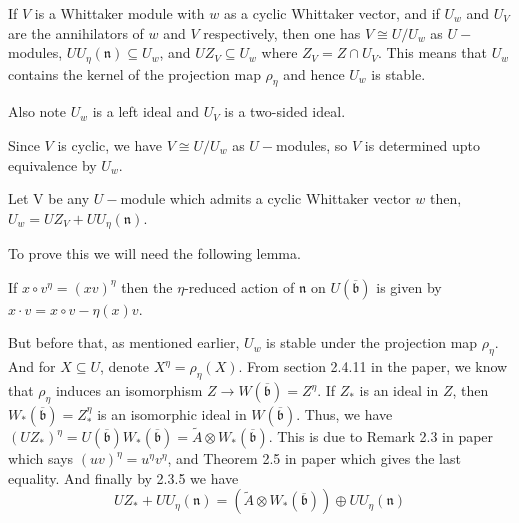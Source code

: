\documentclass{article}
\theoremstyle{mytheoremstyle}
\theoremstyle{mytheoremstyle}
\theoremstyle{myproblemstyle}
\begin{document}
    If $V$ is a Whittaker module with $w$ as a cyclic Whittaker vector, and if $U_w$ and $U_V$ are the annihilators of $w$ and $V$ 
    respectively, then one has $V \cong U/U_w$ as $U-$modules, $UU_\eta(\mathfrak n) \subseteq U_w$, and $UZ_V \subseteq U_w$ where 
    $Z_V = Z \cap U_V$. This means that $U_w$ contains the kernel of the projection map $\rho_\eta$ and hence $U_w$ is stable.

    Also note $U_w$ is a left ideal and $U_V$ is a two-sided ideal.

    \begin{remark}
    Since $V$ is cyclic, we have $V \cong U/U_w$ as $U-$modules, so $V$ is determined upto equivalence by $U_w$.
    \label{remark:V-determined-by-U-w}
    \end{remark}
    

    \begin{theorem}[$U_w$ decomposition]
    \label{thm:U_w_decomposition}
	 Let V be any $U-$module which admits a cyclic Whittaker vector $w$ then, $U_w = UZ_V + UU_\eta(\mathfrak n)$. 
    \end{theorem}

    To prove this we will need the following lemma. 

    \begin{definition}
    If $x \circ v^\eta = (xv)^\eta$ then the $\eta$-reduced action of $\mathfrak n$ on $U(\overline{\mathfrak b})$ is given by
    $x \cdot v = x \circ v - \eta(x)v$.  
    \end{definition}
	But before that, as mentioned earlier, $U_w$ is stable under the projection map $\rho_\eta$. And for $X \subseteq U$, 
	denote $X^\eta = \rho_\eta(X)$. From section 2.4.11 in the paper, we know that $\rho_\eta$ induces an isomorphism 
	$Z \to W(\overline{\mathfrak b}) = Z^\eta$.  
	If $Z_*$ is an ideal in $Z$, then $W_*(\overline{\mathfrak b}) = Z_*^\eta$ is an isomorphic ideal in $W(\overline{\mathfrak b})$.
	Thus, we have $(UZ_*)^\eta = U(\overline{\mathfrak b}) W_*(\overline{\mathfrak b}) = \tilde A \otimes W_*(\overline{\mathfrak b})$.
	This is due to Remark 2.3 in paper which says $(uv)^\eta = u^\eta v^\eta$, 
	and Theorem 2.5 in paper which gives the last equality.  
	And finally by 2.3.5 we have
  \begin{equation}
  UZ_* + UU_\eta(\mathfrak n)  = (\tilde A \otimes W_*(\overline{\mathfrak b})) \oplus UU_\eta(\mathfrak n)
    \label{eq:UZ_*}
  \end{equation}
\end{document}
